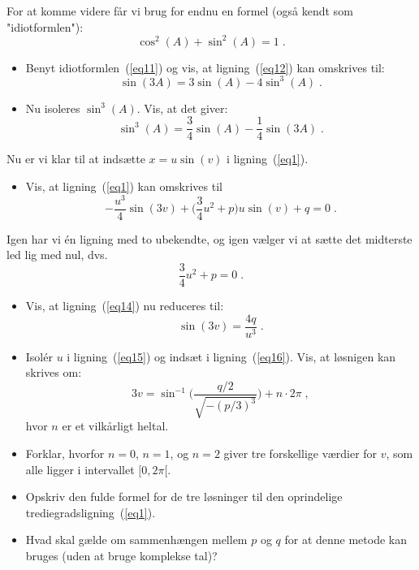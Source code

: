 \documentclass[12pt,oneside,a4paper]{article}
\begin{document}
For at komme videre får vi brug for endnu en formel (også kendt som
"idiotformlen"):
\begin{equation}
    \cos^2(A) + \sin^2(A) = 1 \;.
    \label{eq11}
\end{equation}

\begin{itemize}
    \item Benyt idiotformlen~(\ref{eq11}) og vis, at ligning~(\ref{eq12}) kan 
        omskrives til:
        \begin{equation}
            \sin(3A) = 3\sin(A) - 4\sin^3(A) \;.
            \label{eq13}
        \end{equation}
    \item Nu isoleres $\sin^3(A)$. Vis, at det giver:
        \begin{equation}
            \sin^3(A) = \frac{3}{4} \sin(A) - \frac{1}{4}\sin(3A)\;.
        \end{equation}
\end{itemize}

Nu er vi klar til at indsætte $x=u\sin(v)$ i ligning~(\ref{eq1}).

\begin{itemize}
    \item Vis, at ligning~(\ref{eq1}) kan omskrives til
        \begin{equation}
            -\frac{u^3}{4}\sin(3v) + \Big(\frac{3}{4}u^2+p\Big)u\sin(v)+q=0\;.
            \label{eq14}
        \end{equation}
\end{itemize}

Igen har vi én ligning med to ubekendte, og igen vælger vi at sætte
det midterste led lig med nul, dvs.
        \begin{equation}
            \frac{3}{4}u^2+p = 0\;.
            \label{eq15}
        \end{equation}

\begin{itemize}
    \item Vis, at ligning~(\ref{eq14}) nu reduceres til:
        \begin{equation}
            \sin(3v) = \frac{4q}{u^3} \;.
            \label{eq16}
        \end{equation}
    \item Isolér $u$ i ligning~(\ref{eq15}) og indsæt i ligning~(\ref{eq16}).
         Vis, at løsnigen kan skrives om:
         \begin{equation}
             3v = \sin^{-1}\Bigg(\frac{q/2}{\sqrt{-(p/3)^3}}\Bigg) + n\cdot 2\pi\;,
             \label{eq17}
         \end{equation}
         hvor $n$ er et vilkårligt heltal.
     \item Forklar, hvorfor $n=0$, $n=1$, og $n=2$ giver tre forskellige værdier for $v$, som alle ligger i intervallet $[0, 2\pi[$.
     \item Opskriv den fulde formel for de tre løsninger til den oprindelige trediegradsligning~(\ref{eq1}).
    \item Hvad skal gælde om sammenhængen mellem $p$ og $q$ for at denne metode
        kan bruges (uden at bruge komplekse tal)?
\end{itemize}
\end{document}

